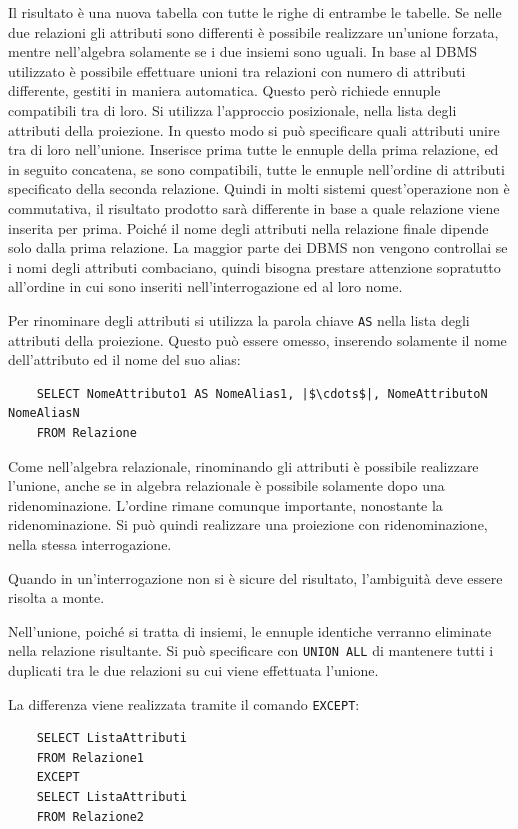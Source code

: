 \documentclass{article}
\numberwithin{equation}{subsection}
\begin{document}
Il risultato è una nuova tabella con tutte le righe di entrambe le tabelle. Se nelle due relazioni gli attributi sono differenti è possibile realizzare un'unione forzata, mentre nell'algebra solamente se i due 
insiemi sono uguali. In base al DBMS utilizzato è possibile effettuare unioni tra relazioni con numero di attributi differente, gestiti in maniera automatica. Questo però richiede ennuple compatibili tra di loro. 
Si utilizza l'approccio posizionale, nella lista degli attributi della proiezione. In questo modo si può specificare quali attributi unire tra di loro nell'unione. Inserisce prima tutte le ennuple della prima relazione, 
ed in seguito concatena, se sono compatibili, tutte le ennuple nell'ordine di attributi specificato della seconda relazione. 
Quindi in molti sistemi quest'operazione non è commutativa, il risultato prodotto sarà differente in base a quale relazione viene inserita per prima. Poiché il nome degli attributi nella relazione finale dipende 
solo dalla prima relazione. 
La maggior parte dei DBMS non vengono controllai se i nomi degli attributi combaciano, quindi bisogna prestare attenzione sopratutto all'ordine in cui sono inseriti nell'interrogazione ed al loro nome. 

Per rinominare degli attributi si utilizza la parola chiave \verb|AS| nella lista degli attributi della proiezione. Questo può essere omesso, inserendo solamente il nome dell'attributo ed il nome del suo alias:
\begin{verbatim}
    SELECT NomeAttributo1 AS NomeAlias1, |$\cdots$|, NomeAttributoN NomeAliasN
    FROM Relazione
\end{verbatim}

Come nell'algebra relazionale, rinominando gli attributi è possibile realizzare l'unione, anche se in algebra relazionale è possibile solamente dopo una ridenominazione. L'ordine rimane comunque importante, 
nonostante la ridenominazione. Si può quindi realizzare una proiezione con ridenominazione, nella stessa interrogazione. 

Quando in un'interrogazione non si è sicure del risultato, l'ambiguità deve essere risolta a monte. 

Nell'unione, poiché si tratta di insiemi, le ennuple identiche verranno eliminate nella relazione risultante. Si può specificare con \verb|UNION ALL| di mantenere tutti i duplicati tra le due relazioni su cui 
viene effettuata l'unione. 


La differenza viene realizzata tramite il comando \verb|EXCEPT|:
\begin{verbatim}
    SELECT ListaAttributi
    FROM Relazione1
    EXCEPT
    SELECT ListaAttributi
    FROM Relazione2
\end{verbatim}
\end{document}
